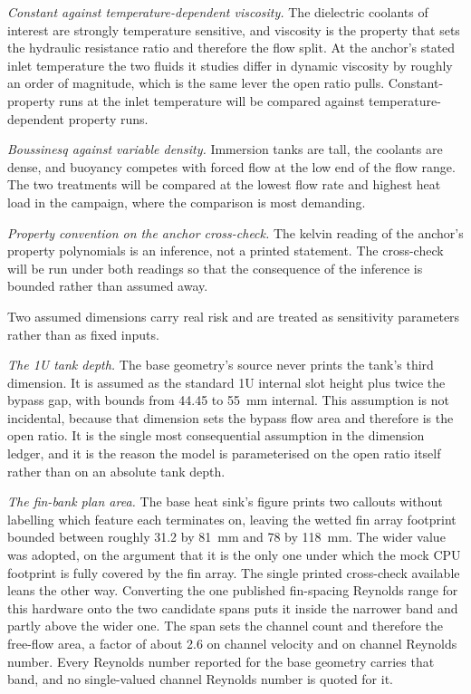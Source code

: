 \emph{Constant against temperature-dependent viscosity.} The dielectric coolants of interest are
strongly temperature sensitive, and viscosity is the property that sets the hydraulic resistance
ratio and therefore the flow split. At the anchor's stated inlet temperature the two fluids it
studies differ in dynamic viscosity by roughly an order of magnitude, which is the same lever the
open ratio pulls. Constant-property runs at the inlet temperature will be compared against
temperature-dependent property runs.

\emph{Boussinesq against variable density.} Immersion tanks are tall, the coolants are dense, and
buoyancy competes with forced flow at the low end of the flow range. The two treatments will be
compared at the lowest flow rate and highest heat load in the campaign, where the comparison is
most demanding.

\emph{Property convention on the anchor cross-check.} The kelvin reading of the anchor's property
polynomials is an inference, not a printed statement. The cross-check will be run under both
readings so that the consequence of the inference is bounded rather than assumed away.

Two assumed dimensions carry real risk and are treated as sensitivity parameters rather than as
fixed inputs.

\emph{The 1U tank depth.} The base geometry's source never prints the tank's third dimension. It is
assumed as the standard 1U internal slot height plus twice the bypass gap, with bounds from 44.45
to 55~mm internal. This assumption is not incidental, because that dimension sets the bypass flow
area and therefore is the open ratio. It is the single most consequential assumption in the
dimension ledger, and it is the reason the model is parameterised on the open ratio itself rather
than on an absolute tank depth.

\emph{The fin-bank plan area.} The base heat sink's figure prints two callouts without labelling
which feature each terminates on, leaving the wetted fin array footprint bounded between roughly
31.2 by 81~mm and 78 by 118~mm. The wider value was adopted, on the argument that it is the only
one under which the mock CPU footprint is fully covered by the fin array. The single printed
cross-check available leans the other way. Converting the one published fin-spacing Reynolds range
for this hardware onto the two candidate spans puts it inside the narrower band and partly above
the wider one. The span sets the channel count and therefore the free-flow area, a factor of about
2.6 on channel velocity and on channel Reynolds number. Every Reynolds number reported for the base
geometry carries that band, and no single-valued channel Reynolds number is quoted for it.

